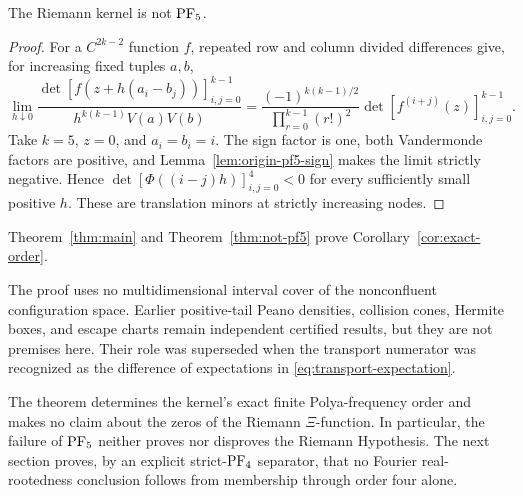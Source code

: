 \begin{theorem}\label{thm:not-pf5}
The Riemann kernel is not \(\mathrm{PF}_5\).
\end{theorem}

\begin{proof}
For a \(C^{2k-2}\) function \(f\), repeated row and column divided differences
give, for increasing fixed tuples \(a,b\),
\[
 \lim_{h\downarrow0}
 \frac{\det[f(z+h(a_i-b_j))]_{i,j=0}^{k-1}}
 {h^{k(k-1)}V(a)V(b)}
 =\frac{(-1)^{k(k-1)/2}}
 {\prod_{r=0}^{k-1}(r!)^2}
 \det[f^{(i+j)}(z)]_{i,j=0}^{k-1}.
\]
Take \(k=5\), \(z=0\), and \(a_i=b_i=i\).  The sign factor is one, both
Vandermonde factors are positive, and Lemma~\ref{lem:origin-pf5-sign} makes
the limit strictly negative.  Hence
\(\det[\Phi((i-j)h)]_{i,j=0}^4<0\) for every sufficiently small positive
\(h\).  These are translation minors at strictly increasing nodes.
\end{proof}

Theorem~\ref{thm:main} and Theorem~\ref{thm:not-pf5} prove
Corollary~\ref{cor:exact-order}.

The proof uses no multidimensional interval cover of the nonconfluent
configuration space. Earlier positive-tail Peano densities, collision cones,
Hermite boxes, and escape charts remain independent certified results, but
they are not premises here. Their role was superseded when the transport
numerator was recognized as the difference of expectations in
\eqref{eq:transport-expectation}.

\begin{remark}
The theorem determines the kernel's exact finite Polya-frequency order and
makes no claim about the zeros of the Riemann \(\Xi\)-function. In particular,
the failure of \(\mathrm{PF}_5\) neither proves nor disproves the Riemann Hypothesis.
The next section proves, by an explicit strict-\(\mathrm{PF}_4\) separator, that no
Fourier real-rootedness conclusion follows from membership through order four
alone.
\end{remark}
